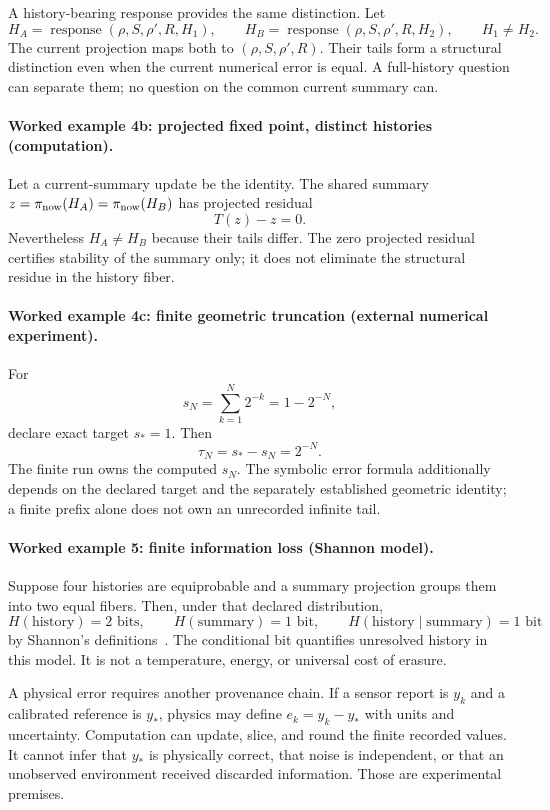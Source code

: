 A history-bearing response provides the same distinction.  Let
\[
 H_A=\operatorname{response}(\rho,S,\rho',R,H_1),\qquad
 H_B=\operatorname{response}(\rho,S,\rho',R,H_2),\qquad H_1\ne H_2.
\]
The current projection maps both to \((\rho,S,\rho',R)\).  Their tails form a structural distinction even when the
current numerical error is equal.  A full-history question can separate them; no question on the common current summary
can.

\paragraph{Worked example 4b: projected fixed point, distinct histories (computation).}
Let a current-summary update be the identity.  The shared summary
\(z=\pi_{\rm now}(H_A)=\pi_{\rm now}(H_B)\) has projected residual
\[
                         T(z)-z=0.
\]
Nevertheless \(H_A\ne H_B\) because their tails differ.  The zero projected residual certifies stability of the
summary only; it does not eliminate the structural residue in the history fiber.

\paragraph{Worked example 4c: finite geometric truncation (external numerical experiment).}
For
\[
 s_N=\sum_{k=1}^{N}2^{-k}=1-2^{-N},
\]
declare exact target \(s_*=1\).  Then
\[
                         \tau_N=s_*-s_N=2^{-N}.
\]
The finite run owns the computed \(s_N\).  The symbolic error formula additionally depends on the declared target and
the separately established geometric identity; a finite prefix alone does not own an unrecorded infinite tail.

\paragraph{Worked example 5: finite information loss (Shannon model).}
Suppose four histories are equiprobable and a summary projection groups them into two equal fibers.  Then, under that
declared distribution,
\[
 H(\text{history})=2\text{ bits},\qquad
 H(\text{summary})=1\text{ bit},\qquad
 H(\text{history}\mid\text{summary})=1\text{ bit}
\]
by Shannon's definitions~\cite{shannon1948}.  The conditional bit quantifies unresolved history in this model.  It is
not a temperature, energy, or universal cost of erasure.

A physical error requires another provenance chain.  If a sensor report is \(y_k\) and a calibrated reference is
\(y_*\), physics may define \(e_k=y_k-y_*\) with units and uncertainty.  Computation can update, slice, and round the
finite recorded values.  It cannot infer that \(y_*\) is physically correct, that noise is independent, or that an
unobserved environment received discarded information.  Those are experimental premises.

